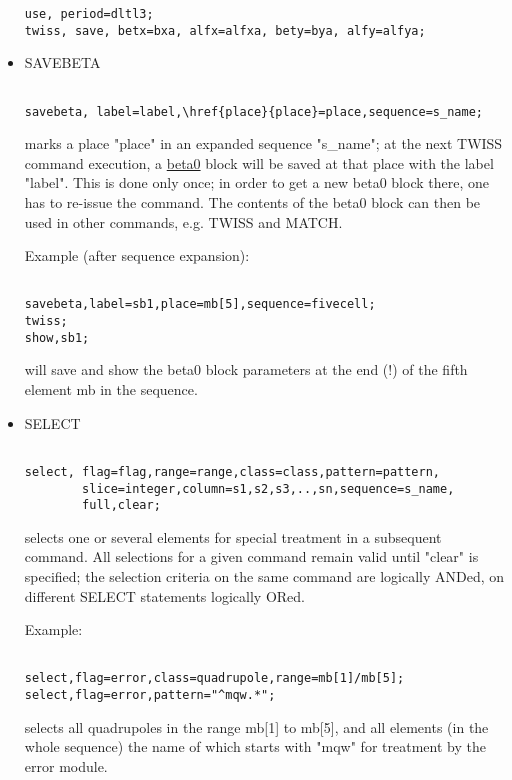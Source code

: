 \begin{itemize}
\begin{verbatim}
use, period=dltl3;
twiss, save, betx=bxa, alfx=alfxa, bety=bya, alfy=alfya;
\end{verbatim}
	\item SAVEBETA
\begin{verbatim}

savebeta, label=label,\href{place}{place}=place,sequence=s_name;
\end{verbatim} marks a place "place" in an expanded sequence "s\_name"; at the next TWISS command execution, a  \href{../twiss/twiss.html#beta0}{beta0} block will be saved at that place with the label "label". This is done only once; in order to get a new beta0 block there, one has to re-issue the command. The contents of the beta0 block can then be used in other commands, e.g. TWISS and MATCH. 

 Example (after sequence expansion): 
\begin{verbatim}

savebeta,label=sb1,place=mb[5],sequence=fivecell;
twiss;
show,sb1;
\end{verbatim} will save and show the beta0 block parameters at the end (!) of the fifth element mb in the sequence. 


	\item SELECT%
\begin{verbatim}

select, flag=flag,range=range,class=class,pattern=pattern,
        slice=integer,column=s1,s2,s3,..,sn,sequence=s_name,
        full,clear;
\end{verbatim} selects one or several elements for special treatment in a subsequent command. All selections for a given command remain valid until "clear" is specified; the selection criteria on the same command are logically ANDed, on different SELECT statements logically ORed. 

 Example: 
\begin{verbatim}

select,flag=error,class=quadrupole,range=mb[1]/mb[5];
select,flag=error,pattern="^mqw.*";
\end{verbatim} selects all quadrupoles in the range mb[1] to mb[5], and all elements (in the whole sequence) the name of which starts with "mqw" for treatment by the error module. 


\end{itemize}
